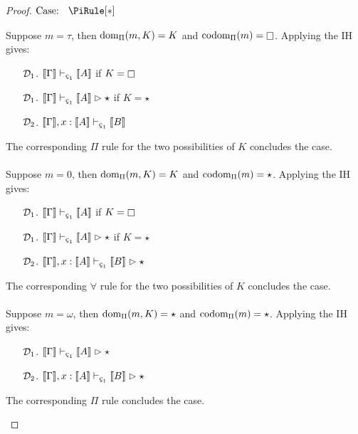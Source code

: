 \begin{proof}
    $\text{Case: }\begin{array}{c} \PiRule[*] \end{array}$
    \begin{proofcase}
        Suppose $m = \tau$, then $\textnormal{dom}_\Pi(m, K) = K$ and $\pcodom(m) = \kind$.
        Applying the IH gives:
        \begin{enumerate}
            \item[$\mathcal{D}_{1}$.] $\sema{\Gamma} \vdash_{\oldced} \sema{A}$ if $K = \kind$
            \item[$\mathcal{D}_{1}$.] $\sema{\Gamma} \vdash_{\oldced} \sema{A} \infr \star$ if $K = \star$
            \item[$\mathcal{D}_{2}$.] $\sema{\Gamma}, x : \sema{A} \vdash_{\oldced} \sema{B}$
        \end{enumerate}
        The corresponding $\Pi$ rule for the two possibilities of $K$ concludes the case.
        \\ \\
        Suppose $m = 0$, then $\textnormal{dom}_\Pi(m, K) = K$ and $\textnormal{codom}_\Pi(m) = \star$.
        Applying the IH gives:
        \begin{enumerate}
            \item[$\mathcal{D}_{1}$.] $\sema{\Gamma} \vdash_{\oldced} \sema{A}$ if $K = \kind$
            \item[$\mathcal{D}_{1}$.] $\sema{\Gamma} \vdash_{\oldced} \sema{A} \infr \star$ if $K = \star$
            \item[$\mathcal{D}_{2}$.] $\sema{\Gamma}, x : \sema{A} \vdash_{\oldced} \sema{B} \infr \star$
        \end{enumerate}
        The corresponding $\forall$ rule for the two possibilities of $K$ concludes the case.
        \\ \\
        Suppose $m = \omega$, then $\textnormal{dom}_\Pi(m, K) = \star$ and $\textnormal{codom}_\Pi(m) = \star$.
        Applying the IH gives:
        \begin{enumerate}
            \item[$\mathcal{D}_{1}$.] $\sema{\Gamma} \vdash_{\oldced} \sema{A} \infr \star$
            \item[$\mathcal{D}_{2}$.] $\sema{\Gamma}, x : \sema{A} \vdash_{\oldced} \sema{B} \infr \star$
        \end{enumerate}
        The corresponding $\Pi$ rule concludes the case.
    \end{proofcase}


\end{proof}
